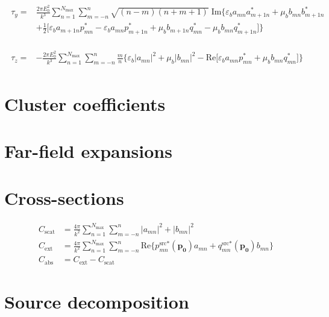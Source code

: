 \documentclass[11pt]{article}
\begin{document}
\begin{align}
\begin{split}
    \tau_y =& \frac{2\pi E_0^2}{k^3} \sum_{n=1}^{N_\text{max}} \sum_{m=-n}^{n} \sqrt{(n-m)(n+m+1)} \; \text{Im} \bigg\{
            \varepsilon_b a_{mn}a_{m+1n}^* + \mu_b b_{mn}b_{m+1n}^* \\
            & + \frac{1}{2} \bigg[ \varepsilon_b a_{m+1n}p_{mn}^* - \varepsilon_b a_{mn}p_{m+1n}^*
            + \mu_b b_{m+1n}q_{mn}^* - \mu_b b_{mn}q_{m+1n}^*\bigg] \bigg\}
\end{split}
\end{align}

\begin{align}
\begin{split}
    \tau_z =& -\frac{2\pi E_0^2}{k^3} \sum_{n=1}^{N_\text{max}} \sum_{m=-n}^{n} \frac{m}{n} \bigg\{
          \varepsilon_b |a_{mn}|^2 + \mu_b |b_{mn}|^2 - \text{Re} \bigg[
              \varepsilon_b a_{mn}p_{mn}^* + \mu_b b_{mn}q_{mn}^*\bigg] \bigg\}
\end{split}
\end{align}

\section{Cluster coefficients}
\section{Far-field expansions}

\section{Cross-sections}

\begin{align}
    C_\text{scat} &= \frac{4\pi}{k^2} \sum_{n=1}^{N_\text{max}} \sum_{m=-n}^{n}
    |a_{mn}|^2 + |b_{mn}|^2 \\
    C_\text{ext} &= \frac{4\pi}{k^2} \sum_{n=1}^{N_\text{max}} \sum_{m=-n}^{n}
    \text{Re} \bigg\{ p_{mn}^{\text{src}*}(\boldsymbol{p_0}) a_{mn} 
    + q_{mn}^{\text{src}*}(\boldsymbol{p_0})b_{mn} \bigg\} \\
    C_\text{abs} &= C_\text{ext} - C_\text{scat}
\end{align}

\section{Source decomposition}
\end{document}
